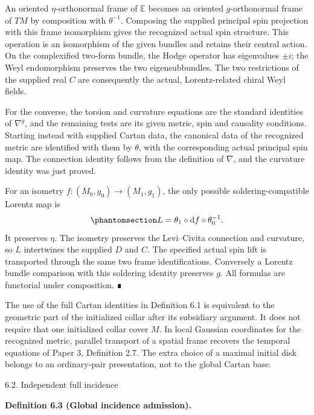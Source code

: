 \documentclass[
  english,
  11pt,
  reqno]{amsart}
\makeatletter
\newcommand{\paperstatementsection}{\@startsection{subsection}{2}%
  \z@{.5\linespacing\@plus.7\linespacing}{.35\baselineskip}%
  {\normalfont\bfseries}}
\newcommand{\paperfirststatement}[1]{%
  {\normalfont\bfseries #1\par}%
  \nobreak\@afterindenttrue\@afterheading}
\makeatother
\begin{document}
An oriented \(\eta\)-orthonormal frame of \(\mathbb E\) becomes an
oriented \(g\)-orthonormal frame of \(TM\) by composition with
\(\theta^{-1}\). Composing the supplied principal spin projection with
this frame isomorphism gives the recognized actual spin structure. This
operation is an isomorphism of the given bundles and retains their
central action. On the complexified two-form bundle, the Hodge operator
has eigenvalues \(\pm i\); the Weyl endomorphism preserves the two
eigensubbundles. The two restrictions of the supplied real \(C\) are
consequently the actual, Lorentz-related chiral Weyl fields.

For the converse, the torsion and curvature equations are the standard
identities of \(\nabla^g\), and the remaining tests are its given
metric, spin and causality conditions. Starting instead with supplied
Cartan data, the canonical data of the recognized metric are identified
with them by \(\theta\), with the corresponding actual principal spin
map. The connection identity follows from the definition of \(\nabla\),
and the curvature identity was just proved.

For an isometry \(f:(M_0,g_0)\to(M_1,g_1)\), the only possible
soldering-compatible Lorentz map is
\begin{equation}\protect\phantomsection\label{eq:global-cartan-comparison-map}{
L=\theta_1\circ\mathrm df\circ\theta_0^{-1}.
}\end{equation} It preserves \(\eta\). The isometry preserves the
Levi--Civita connection and curvature, so \(L\) intertwines the supplied
\(D\) and \(C\). The specified actual spin lift is transported through
the same two frame identifications. Conversely a Lorentz bundle
comparison with this soldering identity preserves \(g\). All formulas
are functorial under composition. ∎

The use of the full Cartan identities in Definition 6.1 is equivalent to
the geometric part of the initialized collar after its subsidiary
argument. It does not require that one initialized collar cover \(M\).
In local Gaussian coordinates for the recognized metric, parallel
transport of a spatial frame recovers the temporal equations of Paper 3,
Definition 2.7. The extra choice of a maximal initial disk belongs to an
ordinary-pair presentation, not to the global Cartan base.

\protect{}\label{sec:global-independent-incidence}
\paperstatementsection{6.2. Independent full
incidence}\label{independent-full-incidence}
\paperfirststatement{\protect{}\label{def:global-independent-incidence}Definition 6.3 (Global incidence admission).}
\end{document}
